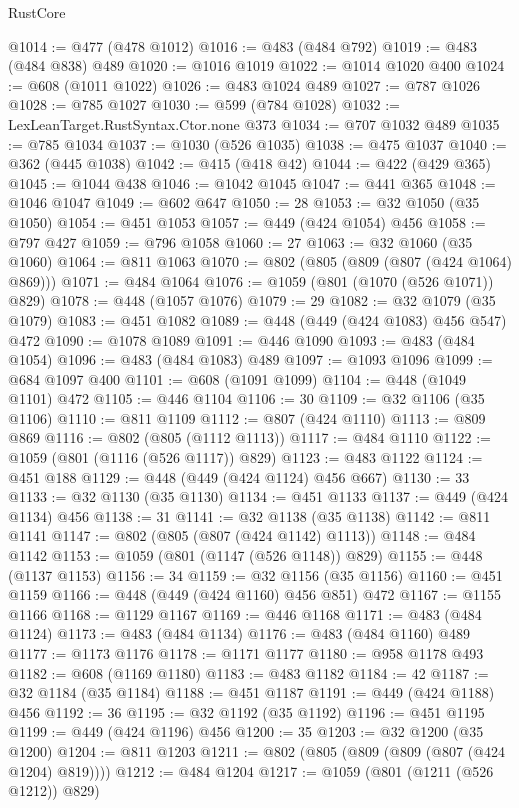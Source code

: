 \begin{lexlean}{RustCore}
\begin{coremodule}
@1014 := @477 (@478 @1012)
@1016 := @483 (@484 @792)
@1019 := @483 (@484 @838) @489
@1020 := @1016 @1019
@1022 := @1014 @1020 @400
@1024 := @608 (@1011 @1022)
@1026 := @483 @1024 @489
@1027 := @787 @1026
@1028 := @785 @1027
@1030 := @599 (@784 @1028)
@1032 := LexLeanTarget.RustSyntax.Ctor.none @373
@1034 := @707 @1032 @489
@1035 := @785 @1034
@1037 := @1030 (@526 @1035)
@1038 := @475 @1037
@1040 := @362 (@445 @1038)
@1042 := @415 (@418 @42)
@1044 := @422 (@429 @365)
@1045 := @1044 @438
@1046 := @1042 @1045
@1047 := @441 @365
@1048 := @1046 @1047
@1049 := @602 @647
@1050 := 28
@1053 := @32 @1050 (@35 @1050)
@1054 := @451 @1053
@1057 := @449 (@424 @1054) @456
@1058 := @797 @427
@1059 := @796 @1058
@1060 := 27
@1063 := @32 @1060 (@35 @1060)
@1064 := @811 @1063
@1070 := @802 (@805 (@809 (@807 (@424 @1064) @869)))
@1071 := @484 @1064
@1076 := @1059 (@801 (@1070 (@526 @1071)) @829)
@1078 := @448 (@1057 @1076)
@1079 := 29
@1082 := @32 @1079 (@35 @1079)
@1083 := @451 @1082
@1089 := @448 (@449 (@424 @1083) @456 @547) @472
@1090 := @1078 @1089
@1091 := @446 @1090
@1093 := @483 (@484 @1054)
@1096 := @483 (@484 @1083) @489
@1097 := @1093 @1096
@1099 := @684 @1097 @400
@1101 := @608 (@1091 @1099)
@1104 := @448 (@1049 @1101) @472
@1105 := @446 @1104
@1106 := 30
@1109 := @32 @1106 (@35 @1106)
@1110 := @811 @1109
@1112 := @807 (@424 @1110)
@1113 := @809 @869
@1116 := @802 (@805 (@1112 @1113))
@1117 := @484 @1110
@1122 := @1059 (@801 (@1116 (@526 @1117)) @829)
@1123 := @483 @1122
@1124 := @451 @188
@1129 := @448 (@449 (@424 @1124) @456 @667)
@1130 := 33
@1133 := @32 @1130 (@35 @1130)
@1134 := @451 @1133
@1137 := @449 (@424 @1134) @456
@1138 := 31
@1141 := @32 @1138 (@35 @1138)
@1142 := @811 @1141
@1147 := @802 (@805 (@807 (@424 @1142) @1113))
@1148 := @484 @1142
@1153 := @1059 (@801 (@1147 (@526 @1148)) @829)
@1155 := @448 (@1137 @1153)
@1156 := 34
@1159 := @32 @1156 (@35 @1156)
@1160 := @451 @1159
@1166 := @448 (@449 (@424 @1160) @456 @851) @472
@1167 := @1155 @1166
@1168 := @1129 @1167
@1169 := @446 @1168
@1171 := @483 (@484 @1124)
@1173 := @483 (@484 @1134)
@1176 := @483 (@484 @1160) @489
@1177 := @1173 @1176
@1178 := @1171 @1177
@1180 := @958 @1178 @493
@1182 := @608 (@1169 @1180)
@1183 := @483 @1182
@1184 := 42
@1187 := @32 @1184 (@35 @1184)
@1188 := @451 @1187
@1191 := @449 (@424 @1188) @456
@1192 := 36
@1195 := @32 @1192 (@35 @1192)
@1196 := @451 @1195
@1199 := @449 (@424 @1196) @456
@1200 := 35
@1203 := @32 @1200 (@35 @1200)
@1204 := @811 @1203
@1211 := @802 (@805 (@809 (@809 (@807 (@424 @1204) @819))))
@1212 := @484 @1204
@1217 := @1059 (@801 (@1211 (@526 @1212)) @829)

\end{coremodule}
\end{lexlean}
